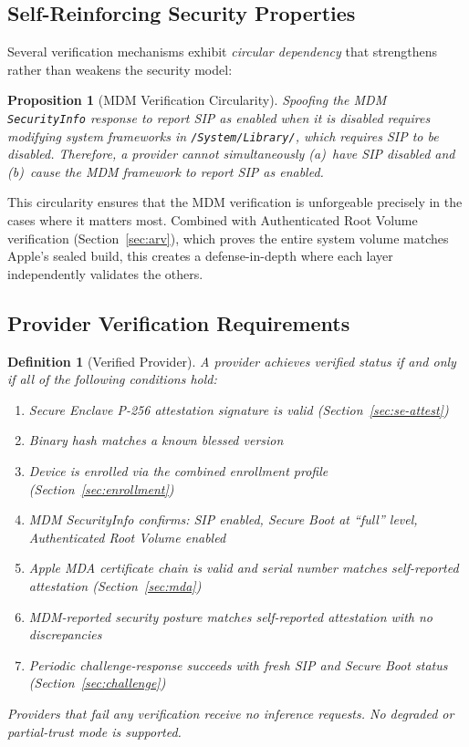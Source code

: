 \documentclass[10pt,twocolumn,letterpaper]{article}
\newtheorem{definition}{Definition}
\newtheorem{proposition}{Proposition}
\begin{document}
\subsection{Self-Reinforcing Security Properties}

Several verification mechanisms exhibit \emph{circular dependency} that strengthens rather than weakens the security model:

\begin{proposition}[MDM Verification Circularity]
\label{prop:mdm-circular}
Spoofing the MDM \texttt{SecurityInfo} response to report SIP as enabled when it is disabled requires modifying system frameworks in \texttt{/System/Library/}, which requires SIP to be disabled. Therefore, a provider cannot simultaneously (a)~have SIP disabled and (b)~cause the MDM framework to report SIP as enabled.
\end{proposition}

This circularity ensures that the MDM verification is unforgeable precisely in the cases where it matters most. Combined with Authenticated Root Volume verification (Section~\ref{sec:arv}), which proves the entire system volume matches Apple's sealed build, this creates a defense-in-depth where each layer independently validates the others.

\subsection{Provider Verification Requirements}

\begin{definition}[Verified Provider]
\label{def:verified}
A provider achieves \emph{verified} status if and only if all of the following conditions hold:
\begin{enumerate}[leftmargin=*,itemsep=1pt]
    \item Secure Enclave P-256 attestation signature is valid (Section~\ref{sec:se-attest})
    \item Binary hash matches a known blessed version
    \item Device is enrolled via the combined enrollment profile (Section~\ref{sec:enrollment})
    \item MDM SecurityInfo confirms: SIP enabled, Secure Boot at ``full'' level, Authenticated Root Volume enabled
    \item Apple MDA certificate chain is valid and serial number matches self-reported attestation (Section~\ref{sec:mda})
    \item MDM-reported security posture matches self-reported attestation with no discrepancies
    \item Periodic challenge-response succeeds with fresh SIP and Secure Boot status (Section~\ref{sec:challenge})
\end{enumerate}
Providers that fail any verification receive no inference requests. No degraded or partial-trust mode is supported.
\end{definition}
\end{document}
